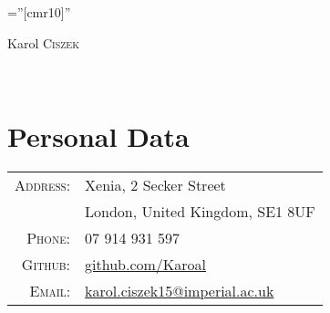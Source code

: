 \documentclass[a4paper,10pt]{article}
\begin{document}

\pagestyle{empty} %

\font\fb=''[cmr10]'' %

\par{\centering
        {\Huge Karol \textsc{Ciszek}\\
    }\bigskip}
    \par{\\}

\section{Personal Data}
\begin{tabular}{rl}
    \textsc{Address:} & Xenia, 2 Secker Street\\
                      & London, United Kingdom, SE1 8UF\\
    \textsc{Phone:}   & 07 914 931 597\\
    \textsc{Github:}  & \href{http://github.com/Karoal}{github.com/Karoal}\\
    \textsc{Email:}   & \href{mailto:karol.ciszek15@imperial.ac.uk}{karol.ciszek15@imperial.ac.uk}
\end{tabular}

\end{document}
